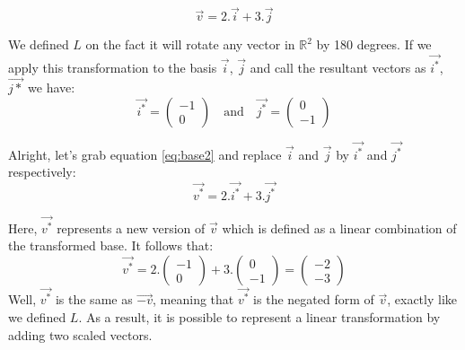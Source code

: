 \documentclass[a4,12pt,twosided,openany]{memoir}
\begin{document}
\begin{equation}\label{eq:base2}
\overrightarrow{v} = 2.\overrightarrow{i} + 3.\overrightarrow{j}
\end{equation}
\par 
\indent
We defined $L$ on the fact it will rotate any vector in  $\mathbb{R}^2$ by 180 degrees. If we apply this transformation to the basis $\overrightarrow{i}$, $\overrightarrow{j}$ and call the resultant vectors as $\overrightarrow{i^*}$, $\overrightarrow{j*}$ we have:
 \[\overrightarrow{i^*} = \begin{pmatrix}
 -1 \\
 0
 \end{pmatrix} \quad \textrm{and} \quad \overrightarrow{j^*} = \begin{pmatrix}
 0\\
 -1
 \end{pmatrix} \]
\par 
\indent
Alright, let’s grab equation \ref{eq:base2} and replace  $\overrightarrow{i}$ and $\overrightarrow{j}$  by $\overrightarrow{i^*}$ and $\overrightarrow{j^*}$ respectively:
\[ \overrightarrow{v^*} = 2.\overrightarrow{i^*} + 3.\overrightarrow{j^*} \]
\par 
\indent
Here, $\overrightarrow{v^*}$ represents a new version of $\overrightarrow{v}$ which is defined as a linear combination of the transformed base. It follows that:
\[ \overrightarrow{v^*} = 2.\begin{pmatrix}
 -1 \\
 0
 \end{pmatrix} + 3.\begin{pmatrix}
 0\\
 -1
 \end{pmatrix} = \begin{pmatrix}
 -2\\
 -3
 \end{pmatrix} \]
 Well, $\overrightarrow{v^*}$ is the same as $\overrightarrow{-v}$, meaning that $\overrightarrow{v^*}$ is the negated form of $\overrightarrow{v}$, exactly like we defined $L$. As a result, it is possible to represent a linear transformation by adding two scaled vectors.
\end{document}
